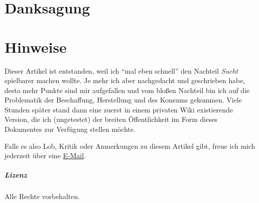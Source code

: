 \clearpage
{}
\printbibliography[title = {Quellen}, heading=bibnumbered]
\clearpage

\chapter{Danksagung}


\chapter{Hinweise}
Dieser Artikel ist entstanden, weil ich \enquote{mal eben schnell} den Nachteil \emph{Sucht} spielbarer machen wollte. Je mehr ich aber nachgedacht und geschrieben habe, desto mehr Punkte sind mir aufgefallen und vom bloßen Nachteil bin ich auf die Problematik der Beschaffung, Herstellung und des Konsums gekommen. Viele Stunden später stand dann eine zuerst in einem privaten Wiki existierende Version, die ich (ungetestet) der breiten Öffentlichkeit im Form dieses Dokumentes zur Verfügung stellen möchte.

Falls es also Lob, Kritik oder Anmerkungen zu diesem Artikel gibt, freue ich mich jederzeit über eine \href{https://kreuvf.de/impressum.php}{E-Mail}.

\paragraph{Lizenz}
Alle Rechte vorbehalten.


